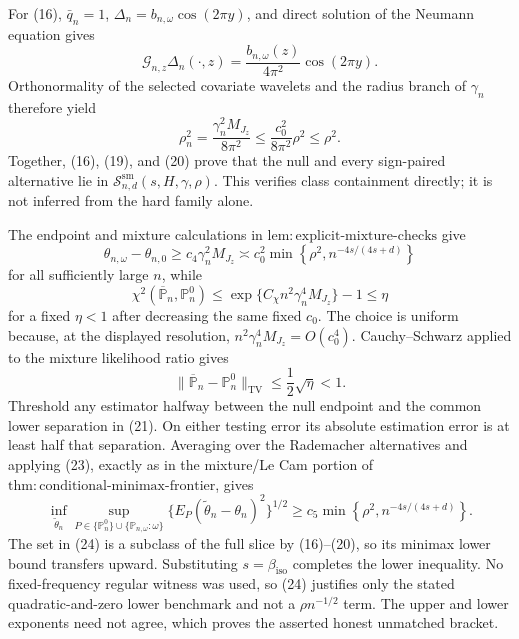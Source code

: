 For (16), \(\bar q_n=1\), \(\Delta_n=b_{n,\omega}\cos(2\pi y)\), and direct solution of the Neumann equation gives
\[
\mathcal G_{n,z}\Delta_n(\cdot,z)
=\frac{b_{n,\omega}(z)}{4\pi^2}\cos(2\pi y).
\]
Orthonormality of the selected covariate wavelets and the radius branch of \(\gamma_n\) therefore yield
\[
\rho_n^2
=\frac{\gamma_n^2M_{J_z}}{8\pi^2}
\le\frac{c_0^2}{8\pi^2}\rho^2
\le\rho^2.
\tag{20}
\]
Together, (16), (19), and (20) prove that the null and every sign-paired alternative lie in \(\mathcal S^{\mathrm{sm}}_{n,d}(s,H,\gamma,\rho)\). This verifies class containment directly; it is not inferred from the hard family alone.

The endpoint and mixture calculations in \(\mathrm{lem{:}explicit\text{-}mixture\text{-}checks}\) give
\[
\theta_{n,\omega}-\theta_{n,0}
\ge c_4\gamma_n^2M_{J_z}
\asymp c_0^2\min\!\left\{\rho^2,n^{-4s/(4s+d)}\right\}
\tag{21}
\]
for all sufficiently large \(n\), while
\[
\chi^2(\overline{\mathbb P}_n,\mathbb P_n^0)
\le\exp\{C_\chi n^2\gamma_n^4M_{J_z}\}-1
\le\eta
\tag{22}
\]
for a fixed \(\eta<1\) after decreasing the same fixed \(c_0\). The choice is uniform because, at the displayed resolution, \(n^2\gamma_n^4M_{J_z}=O(c_0^4)\). Cauchy--Schwarz applied to the mixture likelihood ratio gives
\[
\|\overline{\mathbb P}_n-\mathbb P_n^0\|_{\mathrm{TV}}
\le\frac12\sqrt\eta<1.
\tag{23}
\]
Threshold any estimator halfway between the null endpoint and the common lower separation in (21). On either testing error its absolute estimation error is at least half that separation. Averaging over the Rademacher alternatives and applying (23), exactly as in the mixture/Le Cam portion of \(\mathrm{thm{:}conditional\text{-}minimax\text{-}frontier}\), gives
\[
\inf_{\widetilde\theta_n}
\sup_{P\in\{\mathbb P_n^0\}\cup\{\mathbb P_{n,\omega}:\omega\}}
\{E_P(\widetilde\theta_n-\theta_n)^2\}^{1/2}
\ge c_5\min\!\left\{\rho^2,n^{-4s/(4s+d)}\right\}.
\tag{24}
\]
The set in (24) is a subclass of the full slice by (16)--(20), so its minimax lower bound transfers upward. Substituting \(s=\beta_{\mathrm{iso}}\) completes the lower inequality. No fixed-frequency regular witness was used, so (24) justifies only the stated quadratic-and-zero lower benchmark and not a \(\rho n^{-1/2}\) term. The upper and lower exponents need not agree, which proves the asserted honest unmatched bracket.
